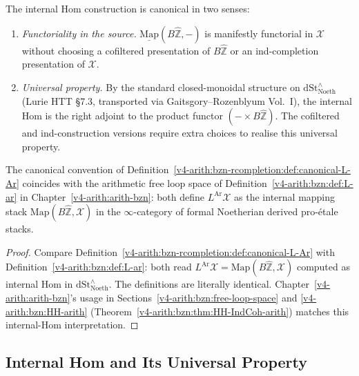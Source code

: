 \begin{remark}
\label{v4-arith:bzn-rcompletion:rem:why-intHom}
The internal Hom construction is canonical in two senses:
\begin{enumerate}
\item \emph{Functoriality in the source.} \(\underline{\mathrm{Map}}(B\widehat{\mathbb{Z}},-)\)
is manifestly functorial in \(\mathcal{X}\) without choosing a
cofiltered presentation of \(B\widehat{\mathbb{Z}}\) or an
ind-completion presentation of \(\mathcal{X}\).
\item \emph{Universal property.} By the standard closed-monoidal
structure on \(\mathrm{dSt}^{\wedge}_{\mathrm{Noeth}}\) (Lurie HTT
\S 7.3, transported via Gaitsgory--Rozenblyum Vol.~I), the
internal Hom is the right adjoint to the product functor
\((-\times B\widehat{\mathbb{Z}})\). The cofiltered and
ind-construction versions require extra choices to realise this
universal property.
\end{enumerate}
\end{remark}

\begin{proposition}
\label{v4-arith:bzn-rcompletion:prop:R3-matches-ch28}
The canonical convention of
Definition~\ref{v4-arith:bzn-rcompletion:def:canonical-L-Ar} coincides with
the arithmetic free loop space of
Definition~\ref{v4-arith:bzn:def:L-ar} in
Chapter~\ref{v4-arith:arith-bzn}: both define \(L^{\mathrm{Ar}}\mathcal{X}\)
as the internal mapping stack
\(\mathrm{Map}(B\widehat{\mathbb{Z}},\mathcal{X})\) in the
\(\infty\)-category of formal Noetherian derived pro-\'etale
stacks.
\end{proposition}

\begin{proof}
Compare Definition~\ref{v4-arith:bzn-rcompletion:def:canonical-L-Ar} with
Definition~\ref{v4-arith:bzn:def:L-ar}: both read
\(L^{\mathrm{Ar}}\mathcal{X}=\mathrm{Map}(B\widehat{\mathbb{Z}},\mathcal{X})\)
computed as internal Hom in
\(\mathrm{dSt}^{\wedge}_{\mathrm{Noeth}}\). The definitions are
literally identical. Chapter~\ref{v4-arith:arith-bzn}'s usage
in Sections~\ref{v4-arith:bzn:free-loop-space} and
\ref{v4-arith:bzn:HH-arith} (Theorem~\ref{v4-arith:bzn:thm:HH-IndCoh-arith})
matches this internal-Hom interpretation.
\end{proof}

\subsection{Internal Hom and Its Universal Property}

